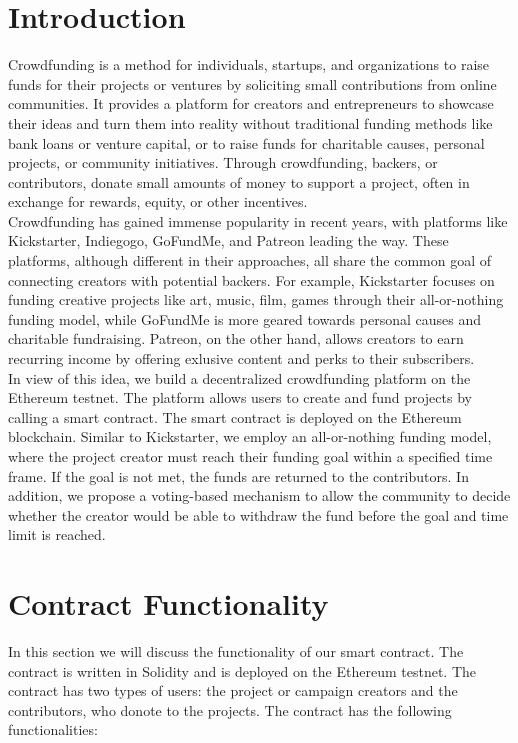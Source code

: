 \documentclass[12pt,reqno]{article}
\begin{document}
\section{Introduction}
Crowdfunding is a method for individuals, startups, and organizations to 
raise funds for their projects or ventures by soliciting small contributions 
from online communities. It provides a platform for creators and entrepreneurs 
to showcase their ideas and turn them into reality without traditional funding 
methods like bank loans or venture capital, or to raise funds for charitable 
causes, personal projects, or community initiatives. Through crowdfunding, backers, 
or contributors, donate small amounts of money to support a project, 
often in exchange for rewards, equity, or other incentives. \\ 
\newline 
Crowdfunding has gained immense popularity in recent years, with platforms like 
Kickstarter, Indiegogo, GoFundMe, and Patreon leading the way. These platforms, 
although different in their approaches, all share the common goal of connecting 
creators with potential backers. For example, Kickstarter focuses on funding 
creative projects like art, music, film, games through their all-or-nothing funding model, 
while GoFundMe is more geared towards personal causes and charitable fundraising. Patreon, 
on the other hand, allows creators to earn recurring income by offering exlusive 
content and perks to their subscribers. \\ 
\newline 
In view of this idea, we build a decentralized crowdfunding platform on the 
Ethereum testnet. The platform allows users to create and fund projects by calling 
a smart contract. The smart contract is deployed on the Ethereum blockchain. Similar to 
Kickstarter, we employ an all-or-nothing funding model, where the project creator 
must reach their funding goal within a specified time frame. If the goal is not met, 
the funds are returned to the contributors. In addition, we propose a voting-based 
mechanism to allow the community to decide whether the creator would be able to withdraw 
the fund before the goal and time limit is reached.  

\newpage

\section{Contract Functionality}
In this section we will discuss the functionality of our smart contract. The contract is 
written in Solidity and is deployed on the Ethereum testnet. The contract has two types of 
users: the project or campaign creators and the contributors, who donote to the projects. The 
contract has the following functionalities: \\
\end{document}
